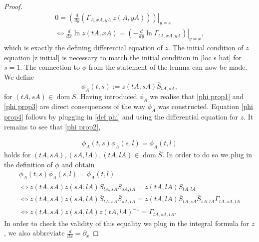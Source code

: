 \documentclass[b5paper,draft,openbib,12pt]{memoir}
\DeclareMathOperator{\dom}{dom}
\begin{document}
\begin{proof}
\begin{align}
0=\left.\left(\frac{d}{dy}(\Gamma_{ A, x A, y A} ~z( A, y A))\right)\right|_{y=x}\\
\iff \frac{d}{dx}\ln z(tA, xA)=\left.\left(-\frac{d}{dy}\ln \Gamma_{t A, xA, yA}\right)\right|_{y=x},
\end{align}
which is exactly the defining differential equation of \(z\). The initial condition of \(z\) equation \eqref{z initial} 
is necessary to match the initial condition in \eqref{loc s hat} for \(s=1\).
The connection to \(\phi\) from the statement of the lemma can now be made.
We define 
\begin{equation}\label{def phi}
\phi_A(t,s):=z(t A, s A) \overline{S}_{t A, s A},
\end{equation}
for \((tA,sA)\in\dom\overline{S}\). Having introduced \(\phi_A\) we realise that \eqref{phi prop1} and \eqref{phi prop3} 
are direct consequences of the way \(\phi_A\) was constructed. Equation \eqref{phi prop4} follows by plugging in 
\eqref{def phi} and using the differential equation for \(z\). It remains to see that \eqref{phi prop2},  

\begin{align}\label{consistency phi}
\phi_A(t,s)\phi_A(s,l)=\phi_A(t,l)
\end{align}
holds for \((tA,sA),(sA,lA),(tA,lA)\in\dom\overline{S}\). In order to do so we plug in the definition of \(\phi\) and obtain
\begin{align}
\phi_A(t,s)\phi_A(s,l)=\phi_A(t,l)\\
\iff z(tA,sA) z(sA,lA)\overline{S}_{tA,sA}\overline{S}_{sA,lA}=z(tA,lA)\overline{S}_{tA,lA}\\
\iff z(tA,sA) z(sA,lA)\overline{S}_{tA,sA}\overline{S}_{sA,lA}=z(tA,lA)\overline{S}_{tA,s A} \overline{S}_{sA,lA}\Gamma_{tA,sA,lA}\\
\iff z(tA,sA) z(sA,lA)z(tA,lA)^{-1}=\Gamma_{tA,sA,lA}.
\end{align}
In order to check the validity of this equality we plug in the integral formula for \(z\), we also abbreviate \(\frac{d}{d x}=\partial_x\)


\end{proof}
\end{document}

